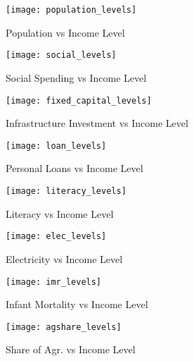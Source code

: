 \documentclass[a4paper, 11pt]{article}
\begin{document}
\begin{figure}[!hp]
    \centering
    \captionsetup{justification=centering}
    \begin{minipage}{0.45\textwidth}
        \centering
        \texttt{[image: population\_levels]} %
        \caption{Population vs Income Level}
    \end{minipage}\hfill
    \begin{minipage}{0.45\textwidth}
        \centering
        \texttt{[image: social\_levels]} %
        \caption{Social Spending vs Income Level}
    \end{minipage}\hfill
    \begin{minipage}{0.45\textwidth}
        \centering
        \texttt{[image: fixed\_capital\_levels]} %
        \caption{Infrastructure Investment vs  Income Level}
    \end{minipage}\hfill
    \begin{minipage}{0.45\textwidth}
        \centering
        \texttt{[image: loan\_levels]} %
        \caption{Personal Loans vs Income Level}
    \end{minipage}\hfill
    \begin{minipage}{0.45\textwidth}
        \centering
        \texttt{[image: literacy\_levels]} %
        \caption{Literacy vs Income Level}
    \end{minipage}\hfill
    \begin{minipage}{0.45\textwidth}
        \centering
        \texttt{[image: elec\_levels]} %
        \caption{Electricity vs Income Level}
    \end{minipage}\hfill
    \begin{minipage}{0.45\textwidth}
        \centering
        \texttt{[image: imr\_levels]} %
        \caption{Infant Mortality vs Income Level}
    \end{minipage}\hfill
    \begin{minipage}{0.45\textwidth}
        \centering
        \texttt{[image: agshare\_levels]} %
        \caption{Share of Agr. vs Income Level}
    \end{minipage}
\end{figure}
\clearpage
\par
\end{document}

